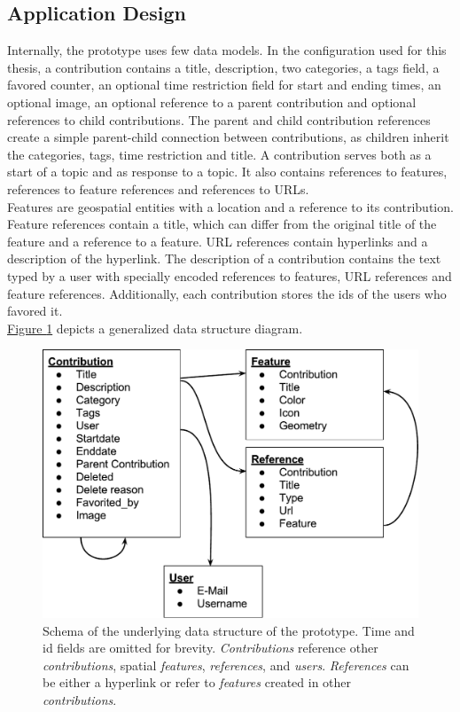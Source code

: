 \subsection{Application Design}
\label{sub:design}
Internally, the prototype uses few data models. In the configuration used for this thesis, a contribution contains a title, description, two categories, a tags field, a favored counter, an optional time restriction field for start and ending times, an optional image, an optional reference to a parent contribution and optional references to child contributions. The parent and child contribution references create a simple parent-child connection between contributions, as children inherit the categories, tags, time restriction and title. A contribution serves both as a start of a topic and as response to a topic. It also contains references to features, references to feature references and references to URLs.\\
Features are geospatial entities with a location and a reference to its contribution.\\
Feature references contain a title, which can differ from the original title of the feature and a reference to a feature. URL references contain hyperlinks and a description of the hyperlink. The description of a contribution contains the text typed by a user with specially encoded references to features, URL references and feature references. Additionally, each contribution stores the ids of the users who favored it.\\
\hyperref[fig:data_structure]{Figure \ref{fig:data_structure}} depicts a generalized data structure diagram.

\begin{figure}[!h]
    \centering
    \includegraphics[width=1\columnwidth]{images/data_structure}
    \caption{Schema of the underlying data structure of the prototype. Time and id fields are omitted for brevity. \textit{Contributions} reference other \textit{contributions}, spatial \textit{features}, \textit{references}, and \textit{users}. \textit{References} can be either a hyperlink or refer to \textit{features} created in other \textit{contributions}.}
    \label{fig:data_structure}
\end{figure}

